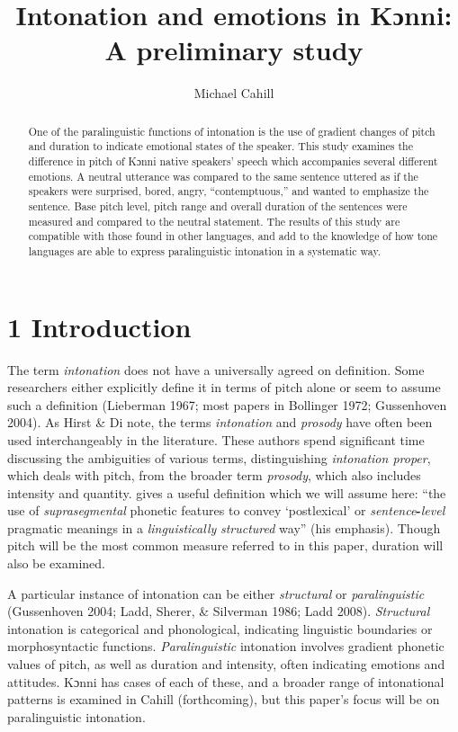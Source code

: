 \documentclass[output=paper]{langsci/langscibook}
\title{Intonation and emotions in {Kɔnni}: {A} preliminary study}
\author{%
 Michael Cahill\affiliation{Cahill affiliation} 
}
\begin{document}
\begin{abstract}
One of the paralinguistic functions of intonation is the use of gradient changes of pitch and duration to indicate emotional states of the speaker. This study examines the difference in pitch of Kɔnni native speakers’ speech which accompanies several different emotions. A neutral utterance was compared to the same sentence uttered as if the speakers were surprised, bored, angry, “contemptuous,” and wanted to emphasize the sentence. Base pitch level, pitch range and overall duration of the sentences were measured and compared to the neutral statement. The results of this study are compatible with those found in other languages, and add to the knowledge of how tone languages are able to express paralinguistic intonation in a systematic way.
\end{abstract}

\chapter{1 Introduction}
\begin{styleBodyTextIndent}
The term \emph{intonation} does not have a universally agreed on definition. Some researchers either explicitly define it in terms of pitch alone or seem to assume such a definition (Lieberman 1967; most papers in Bollinger 1972; Gussenhoven 2004). As Hirst \& Di\citet[3]{Canio1998} note, the terms \emph{intonation} and \emph{prosody} have often been used interchangeably in the literature. These authors spend significant time discussing the ambiguities of various terms, distinguishing \emph{intonation proper}, which deals with pitch, from the broader term \emph{prosody},\emph{ }which also includes intensity and quantity. \citet[4]{Ladd2008} gives a useful definition which we will assume here: “the use of \emph{suprasegmental} phonetic features to convey ‘postlexical’ or \emph{sentence}\textbf{{}-}\emph{level}\textbf{ }pragmatic meanings in a \emph{linguistically}\textbf{ }\emph{structured}\textbf{ }way” (his emphasis). Though pitch will be the most common measure referred to in this paper, duration will also be examined. 
\end{styleBodyTextIndent}

A particular instance of intonation can be either \emph{structural} or \emph{paralinguistic} (Gussenhoven 2004; Ladd, Sherer, \& Silverman 1986; Ladd 2008). \emph{Structural} intonation is categorical and phonological, indicating linguistic boundaries or morphosyntactic functions. \emph{Paralinguistic} intonation involves gradient phonetic values of pitch, as well as duration and intensity, often indicating emotions and attitudes. Kɔnni has cases of each of these, and a broader range of intonational patterns is examined in Cahill (forthcoming), but this paper’s focus will be on paralinguistic intonation.
\end{document}
